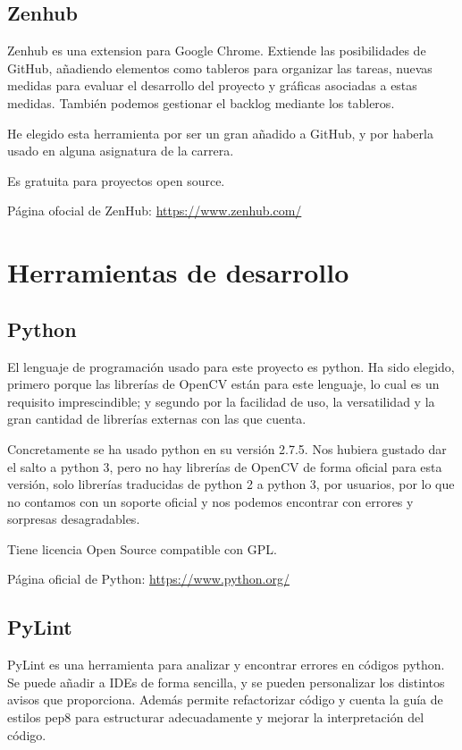 \subsection{Zenhub}
Zenhub es una extension para Google Chrome. Extiende las posibilidades de GitHub, añadiendo elementos como tableros para organizar las tareas, nuevas medidas para evaluar el desarrollo del proyecto y gráficas asociadas a estas medidas. También podemos gestionar el backlog mediante los tableros.

He elegido esta herramienta por ser un gran añadido a GitHub, y por haberla usado en alguna asignatura de la carrera.  

Es gratuita para proyectos open source.

Página ofocial de ZenHub: \url{https://www.zenhub.com/}


\section{Herramientas de desarrollo}

\subsection{Python}
El lenguaje de programación usado para este proyecto es python. Ha sido elegido, primero porque las librerías de OpenCV están para este lenguaje, lo cual es un requisito imprescindible; y segundo por la facilidad de uso, la versatilidad y la gran cantidad de librerías externas con las que cuenta.

Concretamente se ha usado python en su versión 2.7.5.
Nos hubiera gustado dar el salto a python 3, pero no hay librerías de OpenCV de forma oficial para esta versión, solo librerías traducidas de python 2 a python 3, por usuarios, por lo que no contamos con un soporte oficial y nos podemos encontrar con errores y sorpresas desagradables.

Tiene licencia Open Source compatible con GPL.

Página oficial de Python: \url{https://www.python.org/}

\subsection{PyLint}
PyLint es una herramienta para analizar y encontrar errores en códigos python. Se puede añadir a IDEs de forma sencilla, y se pueden personalizar los distintos avisos que proporciona. 
Además permite refactorizar código y cuenta la guía de estilos pep8\cite{pep8} para estructurar adecuadamente y mejorar la interpretación del código.

